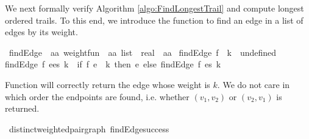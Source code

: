 \begin{isabellebody}
%
\isadelimproof
%
\endisadelimproof
%
\isadelimproof
%
\endisadelimproof
%
\isatagproof
%
\endisatagproof
{\isafoldproof}%
%
\isadelimproof
%
\endisadelimproof
%
\isadelimproof
%
\endisadelimproof
%
\isatagproof
%
\endisatagproof
{\isafoldproof}%
%
\isadelimproof
%
\endisadelimproof
%
\isadelimproof
%
\endisadelimproof
%
\isatagproof
%
\endisatagproof
{\isafoldproof}%
%
\isadelimproof
%
\endisadelimproof
%
\isadelimproof
%
\endisadelimproof
%
\isatagproof
%
\endisatagproof
{\isafoldproof}%
%
\isadelimproof
%
\endisadelimproof
%
\isadelimdocument
%
\endisadelimdocument
%
\isatagdocument
%
\isamarkuptrue%
%
\endisatagdocument
{\isafolddocument}%
%
\isadelimdocument
%
\endisadelimdocument
%
\begin{isamarkuptext}%
\label{section:computeLongestTrail}We next formally verify Algorithm \ref{algo:FindLongestTrail} and compute longest ordered trails. To this end, 
we introduce the function  to find an edge in a list of edges by its weight.%
\end{isamarkuptext}\isamarkuptrue%
\isamarkupfalse%
\ findEdge\ {\isacharcolon}{\isacharcolon}\ {\isachardoublequoteopen}{\isacharparenleft}{\isacharprime}a{\isasymtimes}{\isacharprime}a{\isacharparenright}\ weight{\isacharunderscore}fun\ {\isasymRightarrow}\ {\isacharparenleft}{\isacharprime}a{\isasymtimes}{\isacharprime}a{\isacharparenright}\ list\ {\isasymRightarrow}\ real\ {\isasymRightarrow}\ {\isacharparenleft}{\isacharprime}a{\isasymtimes}{\isacharprime}a{\isacharparenright}{\isachardoublequoteclose}\ \isanewline
{\isachardoublequoteopen}findEdge\ f\ {\isacharbrackleft}{\isacharbrackright}\ k\ {\isacharequal}\ undefined{\isachardoublequoteclose}\ {\isacharbar}\isanewline
{\isachardoublequoteopen}findEdge\ f\ {\isacharparenleft}e{\isacharhash}es{\isacharparenright}\ k\ {\isacharequal}\ {\isacharparenleft}if\ f\ e\ {\isacharequal}\ k\ then\ e\ else\ findEdge\ f\ es\ k{\isacharparenright}{\isachardoublequoteclose}%
\isadelimproof
%
\endisadelimproof
%
\isatagproof
%
\endisatagproof
{\isafoldproof}%
%
\isadelimproof
%
\endisadelimproof
%
\begin{isamarkuptext}%
Function  will correctly return the edge whose weight is $k$. We do not care in which order the endpoints
are found, i.e. whether $(v_1,v_2)$ or $(v_2,v_1)$ is returned.%
\end{isamarkuptext}\isamarkuptrue%
\isamarkupfalse%
{\isacharparenleft}\ distinct{\isacharunderscore}weighted{\isacharunderscore}pair{\isacharunderscore}graph{\isacharparenright}\ findEdge{\isacharunderscore}success{\isacharcolon}\isanewline

\end{isabellebody}
